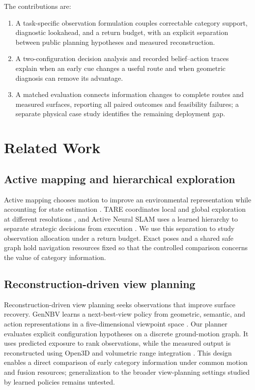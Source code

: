 \documentclass[11pt,a4paper]{article}
\providecommand{\hypertarget}[2]{#2}
\providecommand{\tightlist}{\setlength{\itemsep}{0pt}\setlength{\parskip}{0pt}}
\begin{document}
The contributions are:

\begin{enumerate}
\def\labelenumi{\arabic{enumi}.}
\tightlist
\item
  A task-specific observation formulation couples correctable category support, diagnostic lookahead, and a return budget, with an explicit separation between public planning hypotheses and measured reconstruction.
\item
  A two-configuration decision analysis and recorded belief--action traces explain when an early cue changes a useful route and when geometric diagnosis can remove its advantage.
\item
  A matched evaluation connects information changes to complete routes and measured surfaces, reporting all paired outcomes and feasibility failures; a separate physical case study identifies the remaining deployment gap.
\end{enumerate}

\hypertarget{related-work}{%
\section{Related Work}\label{related-work}}

\hypertarget{active-mapping-and-hierarchical-exploration}{%
\subsection{Active mapping and hierarchical exploration}\label{active-mapping-and-hierarchical-exploration}}

Active mapping chooses motion to improve an environmental representation while accounting for state estimation \cite{ref10}. TARE coordinates local and global exploration at different resolutions \cite{ref5}, and Active Neural SLAM uses a learned hierarchy to separate strategic decisions from execution \cite{ref1}. We use this separation to study observation allocation under a return budget. Exact poses and a shared safe graph hold navigation resources fixed so that the controlled comparison concerns the value of category information.

\hypertarget{reconstruction-driven-view-planning}{%
\subsection{Reconstruction-driven view planning}\label{reconstruction-driven-view-planning}}

Reconstruction-driven view planning seeks observations that improve surface recovery. GenNBV learns a next-best-view policy from geometric, semantic, and action representations in a five-dimensional viewpoint space \cite{ref6}. Our planner evaluates explicit configuration hypotheses on a discrete ground-motion graph. It uses predicted exposure to rank observations, while the measured output is reconstructed using Open3D \cite{ref4} and volumetric range integration \cite{ref11}. This design enables a direct comparison of early category information under common motion and fusion resources; generalization to the broader view-planning settings studied by learned policies remains untested.
\end{document}
